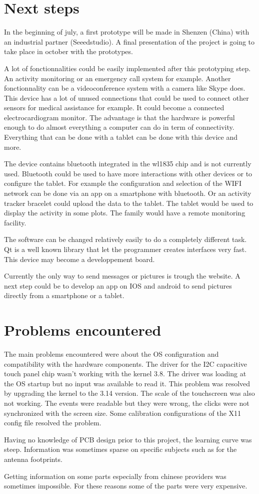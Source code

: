 \section{Next steps}
\label{chap: next steps}

In the beginning of july, a first prototype will be made in Shenzen (China) with an industrial partner (Seeedstudio). A final presentation of the project is going to take place in october with the prototypes.

A lot of fonctionnalities could be easily implemented after this prototyping step. An activity monitoring or an emergency call system for example. Another fonctionnality can be a videoconference system with a camera like Skype does. This device has a lot of unused connections that could be used to connect other sensors for medical assistance for example. It could become a connected electrocardiogram monitor. The advantage is that the hardware is powerful enough to do almost everything a computer can do in term of connectivity. Everything that can be done with a tablet can be done with this device and more.

The device contains bluetooth integrated in the wl1835 chip and is not currently used. Bluetooth could be used to have more interactions with other devices or to configure the tablet. For example the configuration and selection of the WIFI network can be done via an app on a smartphone with bluetooth. Or an activity tracker bracelet could upload the data to the tablet. The tablet would be used to display the activity in some plots. The family would have a remote monitoring facility.

The software can be changed relatively easily to do a completely different task. Qt is a well known library that let the programmer creates interfaces very fast. This device may become a developpement board.

Currently the only way to send messages or pictures is trough the website. A next step could be to develop an app on IOS and android to send pictures directly from a smartphone or a tablet.

\section{Problems encountered}

The main problems encountered were about the OS configuration and compatibility with the hardware components. The driver for the I2C capacitive touch panel chip wasn't working with the kernel 3.8. The driver was loading at the OS startup but no input was available to read it. This problem was resolved by upgrading the kernel to the 3.14 version. The scale of the touchscreen was also not working. The events were readable but they were wrong, the clicks were not synchronized with the screen size. Some calibration configurations of the X11 config file resolved the problem.

Having no knowledge of PCB design prior to this project, the learning curve was steep. Information was sometimes sparse on specific subjects such as for the antenna footprints.

Getting information on some parts especially from chinese providers was sometimes impossible. For these reasons some of the parts were very expensive.
